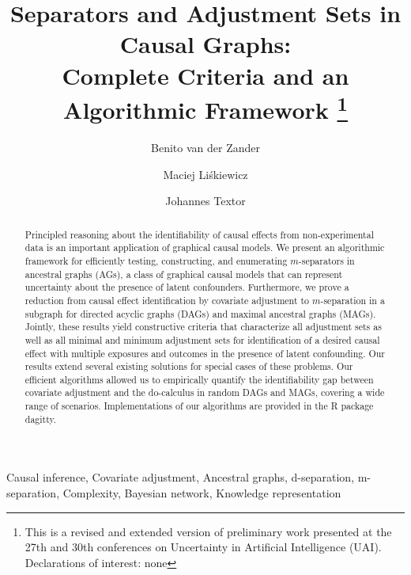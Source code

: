 


\begin{frontmatter}

\title{Separators and Adjustment Sets in Causal Graphs: \\
Complete Criteria and an Algorithmic Framework
\footnote{This is a revised and extended version of 
preliminary work presented at the 27th  \citep{TextorLiskiewicz2011} 
and 30th \citep{zander2014constructing} conferences on 
Uncertainty in Artificial Intelligence (UAI). Declarations of interest: none
}
}



\author[uzl]{Benito van der Zander}

\author[uzl]{Maciej Li\'{s}kiewicz}
\address[uzl]{Institute for Theoretical Computer Science, Universit\"at zu L\"ubeck, Germany}

\author[radboud]{Johannes Textor}
\address[radboud]{Institute for Computing and Information Sciences, Radboud University Nijmegen, Nijmegen, The Netherlands}
 


\begin{abstract}
Principled reasoning about the identifiability of causal effects
from non-experimental data is an important application of graphical
	causal models. 
We present an algorithmic framework for
efficiently testing, constructing, 
and enumerating $m$-separators in ancestral graphs (AGs),
a class of graphical causal models that can represent
uncertainty about the presence of latent confounders.
Furthermore, we prove a reduction from causal effect 
identification by covariate adjustment
to $m$-separation in a subgraph for directed acyclic
graphs (DAGs) and maximal ancestral graphs (MAGs). Jointly,
these results yield constructive criteria that characterize
all adjustment sets as well as
all minimal and minimum adjustment sets for identification
of a desired causal effect with multiple 
exposures and outcomes in the presence of latent confounding.
Our results extend several existing solutions for special
cases of these problems. 
Our efficient algorithms allowed us to empirically quantify
the identifiability gap between covariate
adjustment and the do-calculus in random DAGs and MAGs, 
covering a wide range of scenarios.
Implementations of our algorithms 
are provided in the R package {\sc dagitty}.
\end{abstract}

\begin{keyword}
Causal inference\sep
Covariate adjustment\sep
Ancestral graphs\sep
d-separation\sep
m-separation\sep
Complexity\sep 
Bayesian network\sep
Knowledge representation
\end{keyword}
\end{frontmatter}

